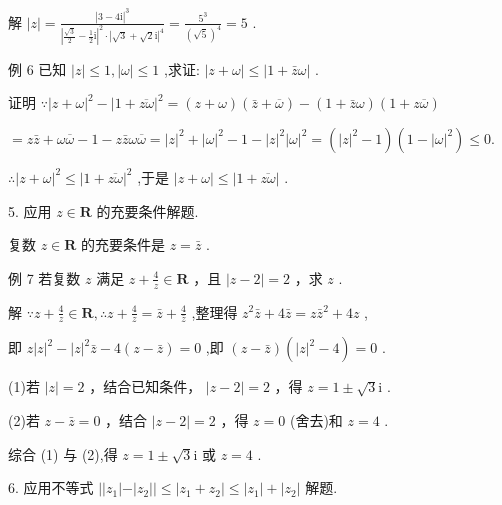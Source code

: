 \documentclass[10pt]{article}
\begin{document}
解 \(\left| z\right|  = \frac{{\left| 3 - 4\mathrm{i}\right| }^{3}}{{\left| \frac{\sqrt{3}}{2} - \frac{1}{2}\mathrm{i}\right| }^{2} \cdot  {\left| \sqrt{3} + \sqrt{2}\mathrm{i}\right| }^{4}} = \frac{{5}^{3}}{{\left( \sqrt{5}\right) }^{4}} = 5\) .

例 6 已知 \(\left| z\right|  \leq  1,\left| \omega \right|  \leq  1\) ,求证: \(\left| {z + \omega }\right|  \leq  \left| {1 + \bar{z}\omega }\right|\) .

证明 \(\because {\left| z + \omega \right| }^{2} - {\left| 1 + \overline{z\omega }\right| }^{2} = \left( {z + \omega }\right) \left( {\bar{z} + \overline{\omega }}\right)  - \left( {1 + \bar{z}\omega }\right) \left( {1 + z\overline{\omega }}\right)\)

\(= z\bar{z} + \omega \overline{\omega } - 1 - z\bar{z}\omega \overline{\omega } = {\left| z\right| }^{2} + {\left| \omega \right| }^{2} - 1 - {\left| z\right| }^{2}{\left| \omega \right| }^{2} = \left( {{\left| z\right| }^{2} - 1}\right) \left( {1 - {\left| \omega \right| }^{2}}\right)  \leq  0.\)

\(\therefore {\left| z + \omega \right| }^{2} \leq  {\left| 1 + \overline{z\omega }\right| }^{2}\) ,于是 \(\left| {z + \omega }\right|  \leq  \left| {1 + \overline{z\omega }}\right|\) .

5. 应用 \(z \in  \mathbf{R}\) 的充要条件解题.

复数 \(z \in  \mathbf{R}\) 的充要条件是 \(z = \bar{z}\) .

例 7 若复数 \(z\) 满足 \(z + \frac{4}{z} \in  \mathbf{R}\) ，且 \(\left| {z - 2}\right|  = 2\) ，求 \(z\) .

解 \(\because z + \frac{4}{z} \in  \mathbf{R},\therefore z + \frac{4}{z} = \bar{z} + \frac{4}{\bar{z}}\) ,整理得 \({z}^{2}\bar{z} + 4\bar{z} = z{\bar{z}}^{2} + {4z}\) ,

即 \(z{\left| z\right| }^{2} - {\left| z\right| }^{2}\bar{z} - 4\left( {z - \bar{z}}\right)  = 0\) ,即 \(\left( {z - \bar{z}}\right) \left( {{\left| z\right| }^{2} - 4}\right)  = 0\) .

(1)若 \(\left| z\right|  = 2\) ，结合已知条件， \(\left| {z - 2}\right|  = 2\) ，得 \(z = 1 \pm  \sqrt{3}\mathrm{i}\) .

(2)若 \(z - \bar{z} = 0\) ，结合 \(\left| {z - 2}\right|  = 2\) ，得 \(z = 0\) (舍去)和 \(z = 4\) .

综合 (1) 与 (2),得 \(z = 1 \pm  \sqrt{3}\mathrm{i}\) 或 \(z = 4\) .

6. 应用不等式 \(\left| \right| {z}_{1}\left| -\right| {z}_{2}\left| \right|  \leq  \left| {{z}_{1} + {z}_{2}}\right|  \leq  \left| {z}_{1}\right|  + \left| {z}_{2}\right|\) 解题.
\end{document}
